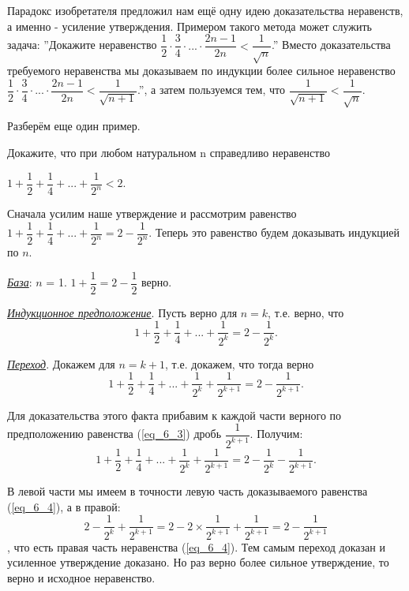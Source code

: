 \par
Парадокс изобретателя предложил нам ещё одну идею доказательства неравенств, а именно - усиление утверждения. Примером такого метода может служить задача: ''Докажите неравенство $\dfrac{1}{2} \cdot \dfrac{3}{4} \cdot ... \cdot \dfrac{2n - 1}{2n} < \dfrac{1}{\sqrt{n}}$.'' Вместо доказательства требуемого неравенства мы доказываем по индукции более сильное неравенство $\dfrac{1}{2} \cdot \dfrac{3}{4} \cdot ... \cdot \dfrac{2n - 1}{2n} < \dfrac{1}{\sqrt{n + 1}}$.'', а затем пользуемся тем, что $\dfrac{1}{\sqrt{n+1}} < \dfrac{1}{\sqrt{n}}$.

\newpage

Разберём еще один пример.

\begin{thm}
Докажите, что при любом натуральном n справедливо неравенство \par $1 + \dfrac{1}{2} + \dfrac{1}{4} + ... + \dfrac{1}{2^n} < 2$.
\end{thm}

\begin{prf}
Сначала усилим наше утверждение и рассмотрим равенство $1 + \dfrac{1}{2} + \dfrac{1}{4} + ... + \dfrac{1}{2^n} = 2 - \dfrac{1}{2^n}$. Теперь это равенство будем доказывать индукцией по $n$.
\par
\textit{\underline{База}}: $n$ = 1. $1 + \dfrac{1}{2} = 2 - \dfrac{1}{2}$ верно.
\par
\textit{\underline{Индукционное предположение}}. Пусть верно для $n = k$, т.е. верно, что
\begin{equation} \label{eq_6_3}
    1 + \dfrac{1}{2} + \dfrac{1}{4} + ... + \dfrac{1}{2^k} = 2 - \dfrac{1}{2^k}.
\end{equation}

\par

\textit{\underline{Переход}}. Докажем для $n = k + 1$, т.е. докажем, что тогда верно
\begin{equation} \label{eq_6_4}
1 + \dfrac{1}{2} + \dfrac{1}{4} + ... + \dfrac{1}{2^k} + \dfrac{1}{2^{k + 1}} = 2 - \dfrac{1}{2^{k + 1}}.
\end{equation}

Для доказательства этого факта прибавим к каждой части верного по предположению равенства (\ref{eq_6_3}) дробь $\dfrac{1}{2^{k+1}}$. Получим:
$$
    1 + \dfrac{1}{2} + \dfrac{1}{4} + ... + \dfrac{1}{2^k} + \dfrac{1}{2^{k + 1}} = 2 - \dfrac{1}{2^k} - \dfrac{1}{2^{k + 1}}.
$$

В левой части мы имеем в точности левую часть доказываемого равенства (\ref{eq_6_4}), а в правой: 
$$
    2 - \dfrac{1}{2^k} + \dfrac{1}{2^{k + 1}} = 2 - 2 \times \dfrac{1}{2^{k + 1}} + \dfrac{1}{2^{k + 1}} = 2 - \dfrac{1}{2^{k + 1}}
$$
, что есть правая часть неравенства (\ref{eq_6_4}). Тем самым переход доказан и усиленное утверждение доказано. Но раз верно более сильное утверждение, то верно и исходное неравенство. \end{prf}

